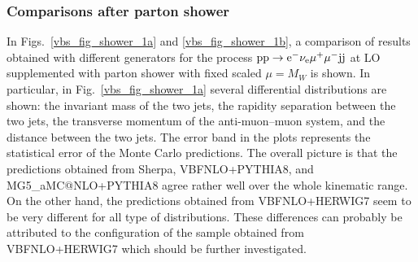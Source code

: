 \documentclass[11pt]{cernrep}
\makeatletter
\newcommand{\MGaMC}{M\protect\scalebox{0.8}{AD}G\protect\scalebox{0.8}{RAPH}5\_aMC@NLO\xspace}
\makeatother
\begin{document}
\subsubsection*{Comparisons after parton shower}

In Figs.~\ref{vbs_fig_shower_1a} and \ref{vbs_fig_shower_1b}, a comparison of results obtained with different
generators for the process ${\rm p} {\rm p} \to {\rm e}^-  \nu_{\rm e}  \mu^+ \mu^- {\rm j} {\rm j}$ at LO supplemented with parton shower with fixed scaled $\mu =M_W$ is shown. 
In particular, in Fig.~\ref{vbs_fig_shower_1a} several differential distributions are shown:
the invariant mass of the two jets, the rapidity separation between
the two jets, the transverse momentum of the anti-muon--muon system,
and the distance between the two jets. The error band in the plots represents the statistical error of the Monte Carlo predictions.  
The overall picture is that the predictions obtained from {\sc Sherpa}, {\sc VBFNLO}+{\sc PYTHIA8}, and \MGaMC+{\sc PYTHIA8} agree rather well over the whole kinematic range.
On the other hand, the predictions obtained from {\sc VBFNLO}+{\sc HERWIG7} seem to be very different for all type of distributions.
These differences can probably be attributed to the configuration of the sample obtained from {\sc VBFNLO}+{\sc HERWIG7} which should be further investigated.
\end{document}
